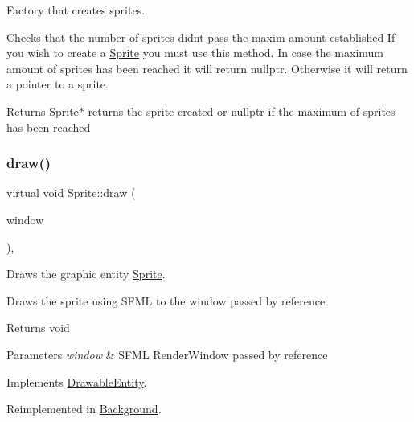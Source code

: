 Factory that creates sprites. 

Checks that the number of sprites didn\textquotesingle{}t pass the maxim amount established If you wish to create a \hyperlink{class_sprite}{Sprite} you must use this method. In case the maximum amount of sprites has been reached it will return nullptr. Otherwise it will return a pointer to a sprite.

\begin{DoxyReturn}{Returns}
Sprite$\ast$ returns the sprite created or nullptr if the maximum of sprites has been reached 
\end{DoxyReturn}
\mbox{\label{class_sprite_a067dfc27f53ce4d983db29407be1c11e}} 
\subsubsection{\texorpdfstring{draw()}{draw()}}
{\footnotesize\ttfamily virtual void Sprite\+::draw (\begin{DoxyParamCaption}\item[{sf\+::\+Render\+Window \&}]{window }\end{DoxyParamCaption})\hspace{0.3cm}{\ttfamily [override]}, {\ttfamily [virtual]}}



Draws the graphic entity \hyperlink{class_sprite}{Sprite}. 

Draws the sprite using S\+F\+ML to the window passed by reference

\begin{DoxyReturn}{Returns}
void 
\end{DoxyReturn}

\begin{DoxyParams}{Parameters}
{\em window} & S\+F\+ML Render\+Window passed by reference \\
\hline
\end{DoxyParams}


Implements \hyperlink{class_drawable_entity_a0b0db9c1325defed216d66a5b4cc755e}{Drawable\+Entity}.



Reimplemented in \hyperlink{class_background_a257183f6d077bbee005760813dbb0592}{Background}.

\mbox{\label{class_sprite_add63c87af068cdcdb536eb1c82644ab4}} 
